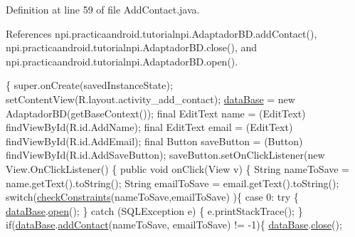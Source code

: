 Definition at line 59 of file Add\-Contact.\-java.



References npi.\-practicaandroid.\-tutorialnpi.\-Adaptador\-B\-D.\-add\-Contact(), npi.\-practicaandroid.\-tutorialnpi.\-Adaptador\-B\-D.\-close(), and npi.\-practicaandroid.\-tutorialnpi.\-Adaptador\-B\-D.\-open().


\begin{DoxyCode}
                                                       \{
        super.onCreate(savedInstanceState);
        setContentView(R.layout.activity\_add\_contact);
        \hyperlink{classnpi_1_1practicaandroid_1_1tutorialnpi_1_1_add_contact_acec65dc472e9b8ad4af1a55b16b6feec}{dataBase} = \textcolor{keyword}{new} AdaptadorBD(getBaseContext());
        \textcolor{keyword}{final} EditText name = (EditText) findViewById(R.id.AddName);
        \textcolor{keyword}{final} EditText email = (EditText) findViewById(R.id.AddEmail);
        \textcolor{keyword}{final} Button saveButton = (Button) findViewById(R.id.AddSaveButton);
        saveButton.setOnClickListener(\textcolor{keyword}{new} View.OnClickListener() \{
            \textcolor{keyword}{public} \textcolor{keywordtype}{void} onClick(View v) \{
                String nameToSave = name.getText().toString();
                String emailToSave = email.getText().toString();
                \textcolor{keywordflow}{switch}(\hyperlink{classnpi_1_1practicaandroid_1_1tutorialnpi_1_1_add_contact_a1b1be0deaca8a499bed880fb55519576}{checkConstraints}(nameToSave,emailToSave)
      )\{
                \textcolor{keywordflow}{case} 0:
                    \textcolor{keywordflow}{try} \{
                        \hyperlink{classnpi_1_1practicaandroid_1_1tutorialnpi_1_1_add_contact_acec65dc472e9b8ad4af1a55b16b6feec}{dataBase}.\hyperlink{classnpi_1_1practicaandroid_1_1tutorialnpi_1_1_adaptador_b_d_a128413ac90cfc708b95c21d946f9600d}{open}();
                    \} \textcolor{keywordflow}{catch} (SQLException e) \{
                        e.printStackTrace();
                    \}
                    \textcolor{keywordflow}{if}(\hyperlink{classnpi_1_1practicaandroid_1_1tutorialnpi_1_1_add_contact_acec65dc472e9b8ad4af1a55b16b6feec}{dataBase}.\hyperlink{classnpi_1_1practicaandroid_1_1tutorialnpi_1_1_adaptador_b_d_ad439502dcc05da37509b1e693be223d9}{addContact}(nameToSave, 
      emailToSave) != -1)\{
                        \hyperlink{classnpi_1_1practicaandroid_1_1tutorialnpi_1_1_add_contact_acec65dc472e9b8ad4af1a55b16b6feec}{dataBase}.\hyperlink{classnpi_1_1practicaandroid_1_1tutorialnpi_1_1_adaptador_b_d_a466dc4c61ae61457cf986b5d8c6f6f52}{close}();

\end{DoxyCode}
